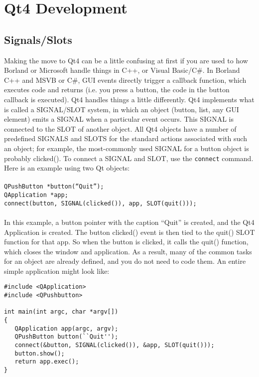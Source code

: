 \section{Qt4 Development}

\subsection{Signals/Slots}Making the move to Qt4 can be a little confusing at first if you are used to how Borland or Microsoft handle things in C++, or Visual Basic/C\#. In Borland C++ and MSVB or C\#, GUI events directly trigger a callback function, which executes code and returns (i.e. you press a button, the code in the button callback is executed). Qt4 handles things a little differently. Qt4 implements what is called a SIGNAL/SLOT system, in which an object (button, list, any GUI element) emits a SIGNAL when a particular event occurs. This SIGNAL is connected to the SLOT of another object. All Qt4 objects have a number of predefined SIGNALS and SLOTS for the standard actions associated with such an object; for example, the most-commonly used SIGNAL for a button object is probably clicked(). To connect a SIGNAL and SLOT, use the \texttt{connect} command. Here is an example using two Qt objects:\\\\
\texttt{QPushButton *button(``Quit'');
\\QApplication *app;
\\connect(button, SIGNAL(clicked()), app, SLOT(quit()));}\\\\

In this example, a button pointer with the caption ``Quit'' is created, and the Qt4 Application is created. The button clicked() event is then tied to the quit() SLOT function for that app. So when the button is clicked, it calls the quit() function, which closes the window and application. As a result, many of the common tasks for an object are already defined, and you do not need to code them. An entire simple application might look like: \\

\begin{verbatim}
#include <QApplication>
#include <QPushbutton>

int main(int argc, char *argv[])
{
   QApplication app(argc, argv);
   QPushButton button(``Quit'');
   connect(&button, SIGNAL(clicked()), &app, SLOT(quit()));
   button.show();
   return app.exec();
}
\end{verbatim}

